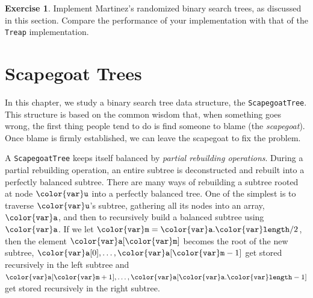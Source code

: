 \documentclass[10pt]{book}
\newcommand{\chaplabel}[1]{\label{chap:#1}}
\theoremstyle{plain}
\theoremstyle{definition}
\newtheorem{exc}{Exercise}[chapter]
\begin{document}
\begin{exc}
  Implement Martinez's randomized binary search trees, as discussed in
  this section.  Compare the performance of your implementation with
  that of the \texttt{Treap} implementation.
\end{exc}


\clearpage

\clearpage
\chapter{Scapegoat Trees}
\chaplabel{scapegoat}

In this chapter, we study a binary search tree data structure, the
\texttt{ScapegoatTree}.  This structure is based on the common wisdom that,
when something goes wrong, the first thing people tend to do is find
someone to blame (the \emph{scapegoat}).
%
Once blame is firmly
established, we can leave the scapegoat to fix the problem.

A \texttt{ScapegoatTree} keeps itself balanced by \emph{partial rebuilding
operations}.
%
%
During a partial rebuilding operation, an entire subtree is
deconstructed and rebuilt into a perfectly balanced subtree.  There are
many ways of rebuilding a subtree rooted at node \ensuremath{\mathtt{{\color{var}u}}} into a perfectly
balanced tree.  One of the simplest is to traverse \ensuremath{\mathtt{{\color{var}u}}}'s subtree,
gathering all its nodes into an array, \ensuremath{\mathtt{{\color{var}a}}}, and then to recursively
build a balanced subtree using \ensuremath{\mathtt{{\color{var}a}}}.  If we let $\ensuremath{\mathtt{{\color{var}m}}}=\ensuremath{\mathtt{{\color{var}a}.{\color{var}length}}}/2$,
then the element \ensuremath{\mathtt{{\color{var}a}[{\color{var}m}]}} becomes the root of the new subtree,
$\ensuremath{\mathtt{{\color{var}a}}}[0],\ldots,\ensuremath{\mathtt{{\color{var}a}}}[\ensuremath{\mathtt{{\color{var}m}}}-1]$ get stored recursively in the left subtree
and $\ensuremath{\mathtt{{\color{var}a}}}[\ensuremath{\mathtt{{\color{var}m}}}+1],\ldots,\ensuremath{\mathtt{{\color{var}a}}}[\ensuremath{\mathtt{{\color{var}a}.{\color{var}length}}}-1]$ get stored recursively in the
right subtree.
\end{document}
